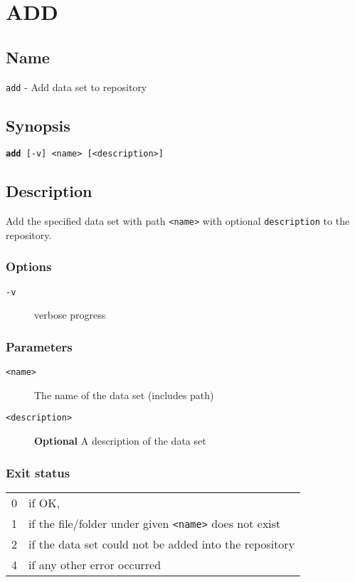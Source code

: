 \documentclass{article} %
\begin{document}
		\section*{ADD}
		\subsection*{Name}
		\texttt{add} - Add data set to repository
		\subsection*{Synopsis}
		\texttt{\textbf{add} [-v] <name> [<description>]}
		\subsection*{Description}
		Add the specified data set with path \texttt{<name>} with optional \texttt{description} to the repository.\\
		
		\noindent
		\subsubsection*{Options}
		\begin{description}
			\item[\texttt{-v}] verbose progress
		\end{description}
		
		\subsubsection*{Parameters}
		\begin{description}
			\item[\texttt{<name>}] The name of the data set (includes path)
			\item[\texttt{<description>}] \textbf{Optional} A description of the data set
		\end{description}
		\subsubsection*{Exit status}
		\begin{tabular}{ll}
			0 &  if OK,\\ 
			1 &  if the file/folder under given \texttt{<name>} does not exist\\ 
			2 &  if the data set could not be added into the repository\\
			4 &  if any other error occurred\\
		\end{tabular}
\end{document}
